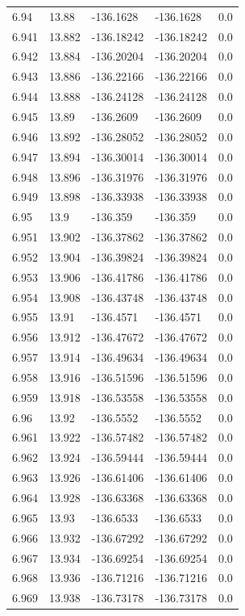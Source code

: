 \begin{tabular}{lllll}
6.94 & 13.88 & -136.1628 & -136.1628 & 0.0 \\
6.941 & 13.882 & -136.18242 & -136.18242 & 0.0 \\
6.942 & 13.884 & -136.20204 & -136.20204 & 0.0 \\
6.943 & 13.886 & -136.22166 & -136.22166 & 0.0 \\
6.944 & 13.888 & -136.24128 & -136.24128 & 0.0 \\
6.945 & 13.89 & -136.2609 & -136.2609 & 0.0 \\
6.946 & 13.892 & -136.28052 & -136.28052 & 0.0 \\
6.947 & 13.894 & -136.30014 & -136.30014 & 0.0 \\
6.948 & 13.896 & -136.31976 & -136.31976 & 0.0 \\
6.949 & 13.898 & -136.33938 & -136.33938 & 0.0 \\
6.95 & 13.9 & -136.359 & -136.359 & 0.0 \\
6.951 & 13.902 & -136.37862 & -136.37862 & 0.0 \\
6.952 & 13.904 & -136.39824 & -136.39824 & 0.0 \\
6.953 & 13.906 & -136.41786 & -136.41786 & 0.0 \\
6.954 & 13.908 & -136.43748 & -136.43748 & 0.0 \\
6.955 & 13.91 & -136.4571 & -136.4571 & 0.0 \\
6.956 & 13.912 & -136.47672 & -136.47672 & 0.0 \\
6.957 & 13.914 & -136.49634 & -136.49634 & 0.0 \\
6.958 & 13.916 & -136.51596 & -136.51596 & 0.0 \\
6.959 & 13.918 & -136.53558 & -136.53558 & 0.0 \\
6.96 & 13.92 & -136.5552 & -136.5552 & 0.0 \\
6.961 & 13.922 & -136.57482 & -136.57482 & 0.0 \\
6.962 & 13.924 & -136.59444 & -136.59444 & 0.0 \\
6.963 & 13.926 & -136.61406 & -136.61406 & 0.0 \\
6.964 & 13.928 & -136.63368 & -136.63368 & 0.0 \\
6.965 & 13.93 & -136.6533 & -136.6533 & 0.0 \\
6.966 & 13.932 & -136.67292 & -136.67292 & 0.0 \\
6.967 & 13.934 & -136.69254 & -136.69254 & 0.0 \\
6.968 & 13.936 & -136.71216 & -136.71216 & 0.0 \\
6.969 & 13.938 & -136.73178 & -136.73178 & 0.0 \\

\end{tabular}
